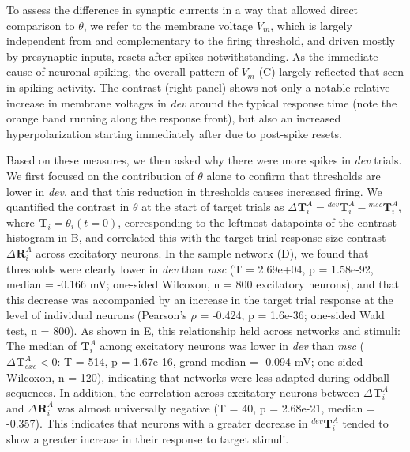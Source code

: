 \documentclass[9pt,lineno,onehalfspacing]{elife}
\newcommand{\dev}{\textit{dev}}
\newcommand{\msc}{\textit{msc}}
\newcommand{\R}[3][]{{}^{#1}_{}\boldsymbol R^{#2}_{#3}}
\newcommand{\T}[3][]{{}^{#1}_{}\boldsymbol T^{#2}_{#3}}
\begin{document}
To assess the difference in synaptic currents in a way that allowed direct comparison to $\theta$, we refer to the membrane voltage $V_m$, which is largely independent from and complementary to the firing threshold, and driven mostly by presynaptic inputs, resets after spikes notwithstanding. As the immediate cause of neuronal spiking, the overall pattern of $V_m$ (C) largely reflected that seen in spiking activity. The contrast (right panel) shows not only a notable relative increase in membrane voltages in \dev{} around the typical response time (note the orange band running along the response front), but also an increased hyperpolarization starting immediately after due to post-spike resets.

Based on these measures, we then asked why there were more spikes in \dev{} trials. We first focused on the contribution of $\theta$ alone to confirm that thresholds are lower in \dev{}, and that this reduction in thresholds causes increased firing. We quantified the contrast in $\theta$ at the start of target trials as $\Delta \T{A}{i} = \T[dev]{A}{i} - \T[msc]{A}{i}$, where $\T{}{i} = \theta_i(t=0)$, corresponding to the leftmost datapoints of the contrast histogram in B, and correlated this with the target trial response size contrast $\Delta \R{A}{i}$ across excitatory neurons. In the sample network (D), we found that thresholds were clearly lower in \dev{} than \msc{} (T = 2.69e+04, p = 1.58e-92, median = -0.166 mV; one-sided Wilcoxon, n = 800 excitatory neurons), and that this decrease was accompanied by an increase in the target trial response at the level of individual neurons (Pearson's $\rho$ = -0.424, p = 1.6e-36; one-sided Wald test, n = 800). As shown in E, this relationship held across networks and stimuli: The median of $\T{A}{i}$ among excitatory neurons was lower in \dev{} than \msc{} ($\Delta \T{A}{exc} < 0$: T = 514, p = 1.67e-16, grand median = -0.094 mV; one-sided Wilcoxon, n = 120), indicating that networks were less adapted during oddball sequences. In addition, the correlation across excitatory neurons between $\Delta \T{A}{i}$ and $\Delta \R{A}{i}$ was almost universally negative (T = 40, p = 2.68e-21, median = -0.357). This indicates that neurons with a greater decrease in $\T[dev]{A}{i}$ tended to show a greater increase in their response to target stimuli.
\end{document}
